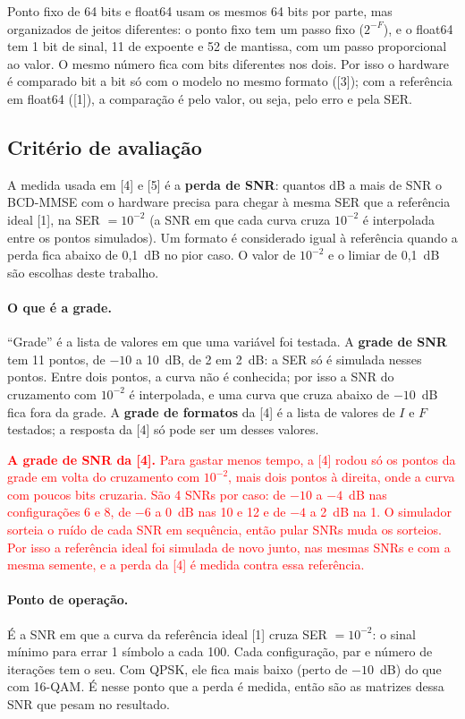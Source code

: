 \documentclass[11pt]{article}
\newcommand{\novo}[1]{\textcolor{red}{#1}}
\begin{document}
Ponto fixo de 64 bits e float64 usam os mesmos 64 bits por parte, mas organizados de jeitos
diferentes: o ponto fixo tem um passo fixo ($2^{-F}$), e o float64 tem 1 bit de sinal, 11 de
expoente e 52 de mantissa, com um passo proporcional ao valor. O mesmo número fica com bits
diferentes nos dois. Por isso o hardware é comparado bit a bit só com o modelo no mesmo
formato ([3]); com a referência em float64 ([1]), a comparação é pelo valor, ou seja, pelo erro
e pela SER.

\subsection*{Critério de avaliação}

A medida usada em [4] e [5] é a \textbf{perda de SNR}: quantos dB a mais de SNR o BCD-MMSE com o
hardware precisa para chegar à mesma SER que a referência ideal [1], na SER $= 10^{-2}$ (a SNR
em que cada curva cruza $10^{-2}$ é interpolada entre os pontos simulados). Um formato é
considerado igual à referência quando a perda fica abaixo de 0,1~dB no pior caso. O valor de
$10^{-2}$ e o limiar de 0,1~dB são escolhas deste trabalho.

\paragraph{O que é a grade.} ``Grade'' é a lista de valores em que uma variável foi testada. A
\textbf{grade de SNR} tem 11 pontos, de $-10$ a 10~dB, de 2 em 2~dB: a SER só é simulada nesses
pontos. Entre dois pontos, a curva não é conhecida; por isso a SNR do cruzamento com $10^{-2}$ é
interpolada, e uma curva que cruza abaixo de $-10$~dB fica fora da grade. A \textbf{grade de
formatos} da [4] é a lista de valores de $I$ e $F$ testados; a resposta da [4] só pode ser um
desses valores.

\novo{\textbf{A grade de SNR da [4].} Para gastar menos tempo, a [4] rodou só os pontos da
grade em volta do cruzamento com $10^{-2}$, mais dois pontos à direita, onde a curva com poucos
bits cruzaria. São 4 SNRs por caso: de $-10$ a $-4$~dB nas configurações 6 e 8, de $-6$ a 0~dB
nas 10 e 12 e de $-4$ a 2~dB na 1. O simulador sorteia o ruído de cada SNR em sequência, então
pular SNRs muda os sorteios. Por isso a referência ideal foi simulada de novo junto, nas mesmas
SNRs e com a mesma semente, e a perda da [4] é medida contra essa referência.}

\paragraph{Ponto de operação.} É a SNR em que a curva da referência ideal [1] cruza
SER $= 10^{-2}$: o sinal mínimo para errar 1 símbolo a cada 100. Cada configuração, par e número
de iterações tem o seu. Com QPSK, ele fica mais baixo (perto de $-10$~dB) do que com 16-QAM. É
nesse ponto que a perda é medida, então são as matrizes dessa SNR que pesam no resultado.
\end{document}
